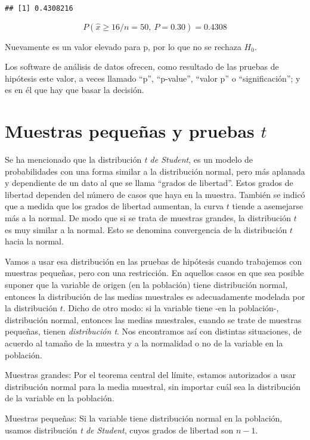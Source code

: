 \documentclass[]{book}
\begin{document}
\begin{verbatim}
## [1] 0.4308216
\end{verbatim}

\[P(\widehat{x} \geq 16/n = 50,\ P = 0.30) = 0.4308\]

Nuevamente es un valor elevado para p, por lo que no se rechaza \(H_{0}\).

Los software de análisis de datos ofrecen, como resultado de las pruebas
de hipótesis este valor, a veces llamado ``p'', ``p-value'', ``valor p'' o
``significación''; y es en él que hay que basar la decisión.

\hypertarget{muestras-pequeuxf1as-y-pruebas-t}{%
\section{\texorpdfstring{Muestras pequeñas y pruebas \(t\)}{Muestras pequeñas y pruebas t}}\label{muestras-pequeuxf1as-y-pruebas-t}}

Se ha mencionado que la distribución \emph{t de Student}, es un modelo de
probabilidades con una forma similar a la distribución normal, pero más
aplanada y dependiente de un dato al que se llama ``grados de libertad''.
Estos grados de libertad dependen del número de casos que haya en la
muestra. También se indicó que a medida que los grados de libertad
aumentan, la curva \(t\) tiende a asemejarse más a la normal. De modo que
si se trata de muestras grandes, la distribución \(t\) es muy similar a la
normal. Esto se denomina convergencia de la distribución \(t\) hacia la
normal.

Vamos a usar esa distribución en las pruebas de hipótesis cuando
trabajemos con muestras pequeñas, pero con una restricción. En aquellos
casos en que sea posible suponer que la variable de origen (en la
población) tiene distribución normal, entonces la distribución de las
medias muestrales es adecuadamente modelada por la distribución \(t\).
Dicho de otro modo: si la variable tiene -en la población-, distribución
normal, entonces las medias muestrales, cuando se trate de muestras
pequeñas, tienen \emph{distribución t}. Nos encontramos así con distintas
situaciones, de acuerdo al tamaño de la muestra y a la normalidad o no
de la variable en la población.

Muestras grandes: Por el teorema central del límite, estamos autorizados
a usar distribución normal para la media muestral, sin importar cuál sea
la distribución de la variable en la población.

Muestras pequeñas: Si la variable tiene distribución normal en la
población, usamos distribución \emph{t de Student}, cuyos grados de libertad
son \(n-1\).
\end{document}
